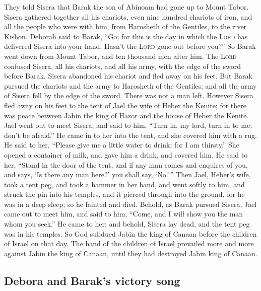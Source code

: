  They told Sisera that Barak the son of Abinoam had gone
up to Mount Tabor.  Sisera gathered together all his
chariots, even nine hundred chariots of iron, and all the people who
were with him, from Harosheth of the Gentiles, to the river Kishon.
 Deborah said to Barak, ``Go; for this is the day in
which the \textsc{Lord} has delivered Sisera into your hand. Hasn't the
\textsc{Lord} gone out before you?'' So Barak went down from Mount
Tabor, and ten thousand men after him.  The \textsc{Lord}
confused Sisera, all his chariots, and all his army, with the edge of
the sword before Barak. Sisera abandoned his chariot and fled away on
his feet.  But Barak pursued the chariots and the army to
Harosheth of the Gentiles; and all the army of Sisera fell by the edge
of the sword. There was not a man left.  However Sisera
fled away on his feet to the tent of Jael the wife of Heber the Kenite;
for there was peace between Jabin the king of Hazor and the house of
Heber the Kenite.  Jael went out to meet Sisera, and said
to him, ``Turn in, my lord, turn in to me; don't be afraid.'' He came in
to her into the tent, and she covered him with a rug.  He
said to her, ``Please give me a little water to drink; for I am
thirsty.'' She opened a container of milk, and gave him a drink, and
covered him.  He said to her, ``Stand in the door of the
tent, and if any man comes and enquires of you, and says, `Is there any
man here?' you shall say, `No.'\,''  Then Jael, Heber's
wife, took a tent peg, and took a hammer in her hand, and went softly to
him, and struck the pin into his temples, and it pierced through into
the ground, for he was in a deep sleep; so he fainted and died.
 Behold, as Barak pursued Sisera, Jael came out to meet
him, and said to him, ``Come, and I will show you the man whom you
seek.'' He came to her; and behold, Sisera lay dead, and the tent peg
was in his temples.  So God subdued Jabin the king of
Canaan before the children of Israel on that day.  The
hand of the children of Israel prevailed more and more against Jabin the
king of Canaan, until they had destroyed Jabin king of Canaan.

\hypertarget{debora-and-baraks-victory-song}{%
\subsection{Debora and Barak's victory
song}\label{debora-and-baraks-victory-song}}

